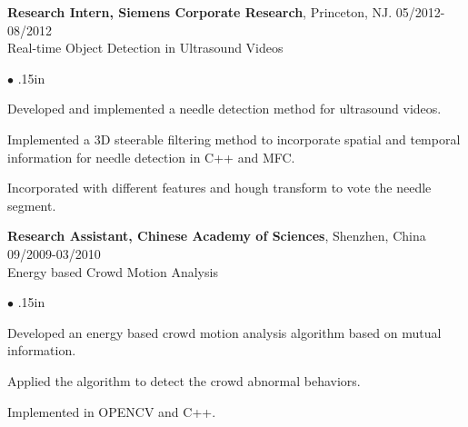 \documentclass[line,margin]{res}
\newenvironment{bullets}{\begin{list}{\tiny$\bullet$}{\topsep 0pt \itemsep -2pt \leftmargin .15in}}{\vspace*{4pt}\end{list}}
\begin{document}
\begin{resume}
\textbf{Research Intern, Siemens Corporate Research}, Princeton, NJ. \hfill      05/2012-08/2012 \\
Real-time Object Detection in Ultrasound Videos
\begin{bullets} 
\item Developed and implemented a needle detection method for ultrasound videos. 
\item Implemented a 3D steerable filtering method to incorporate spatial and temporal information for needle detection in C++ and MFC.
\item Incorporated with different features and hough transform to vote the needle segment.
\end{bullets}
\vspace{-.1in}

\textbf{Research Assistant, Chinese Academy of Sciences}, Shenzhen, China   \hfill      09/2009-03/2010 \\ %
Energy based Crowd Motion Analysis
\begin{bullets}
\item Developed an energy based crowd motion analysis algorithm based on mutual information.
\item Applied the algorithm to detect the crowd abnormal behaviors.
\item Implemented in OPENCV and C++.
\end{bullets}
\vspace{-.1in}


\end{resume}
\end{document}
